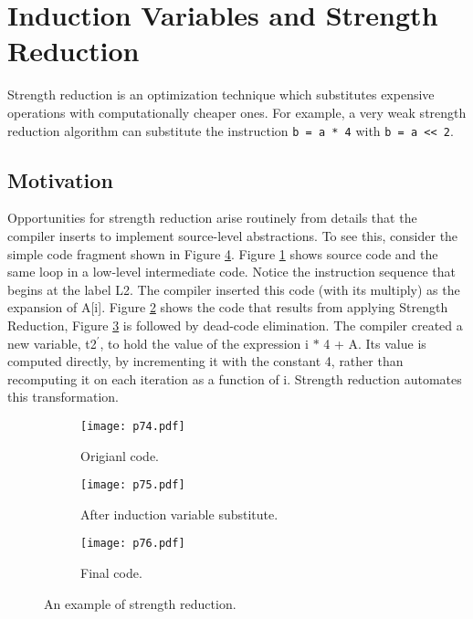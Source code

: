 \newpage

\section{Induction Variables and Strength Reduction}
Strength reduction is an optimization technique which substitutes expensive operations with computationally cheaper ones. For example, a very weak strength reduction algorithm can substitute the instruction
\texttt{b = a * 4} with \texttt{b = a << 2}.

\subsection{Motivation}

Opportunities for strength reduction arise routinely from details that the compiler
inserts to implement source-level abstractions. To see this, consider the simple
code fragment shown in Figure \ref{fig:p74-76}. Figure \ref{fig:p74} shows source code and the same loop in a low-level intermediate code.
Notice the instruction sequence that begins at the label L2. The compiler inserted this code
(with its multiply) as the expansion of A[i]. Figure \ref{fig:p75}  shows the code that results from applying Strength Reduction,
Figure \ref{fig:p76} is followed by dead-code elimination. The compiler created a new variable, t2$^\prime$, to
hold the value of the expression i $*$ 4 + A. Its value is computed directly, by
incrementing it with the constant 4, rather than recomputing it on each iteration
as a function of i. Strength reduction automates this transformation.

\begin{figure}[H]
	\centering
	\begin{subfigure}{0.6\textwidth}
		\centering
		\texttt{[image: p74.pdf]}
		\caption{Origianl code.}
		\label{fig:p74}
	\end{subfigure}
	\begin{subfigure}{0.6\textwidth}
		\centering
		\texttt{[image: p75.pdf]}
		\caption{After induction variable substitute.}
		\label{fig:p75}
	\end{subfigure}
	\begin{subfigure}{0.6\textwidth}
		\centering
		\texttt{[image: p76.pdf]}
		\caption{Final code.}
		\label{fig:p76}
	\end{subfigure}
	\caption{An example of strength reduction.}
	\label{fig:p74-76}
\end{figure}



